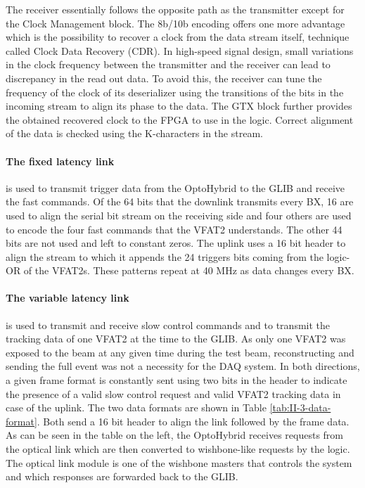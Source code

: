       The receiver essentially follows the opposite path as the transmitter except for the Clock Management block. The 8b/10b encoding offers one more advantage which is the possibility to recover a clock from the data stream itself, technique called Clock Data Recovery (CDR). In high-speed signal design, small variations in the clock frequency between the transmitter and the receiver can lead to discrepancy in the read out data. To avoid this, the receiver can tune the frequency of the clock of its deserializer using the transitions of the bits in the incoming stream to align its phase to the data. The GTX block further provides the obtained recovered clock to the FPGA to use in the logic. Correct alignment of the data is checked using the K-characters in the stream.

      \paragraph{The fixed latency link} is used to transmit trigger data from the OptoHybrid to the GLIB and receive the fast commands. Of the 64 bits that the downlink transmits every BX, 16 are used to align the serial bit stream on the receiving side and four others are used to encode the four fast commands that the VFAT2 understands. The other 44 bits are not used and left to constant zeros. The uplink uses a 16 bit header to align the stream to which it appends the 24 triggers bits coming from the logic-OR of the VFAT2s. These patterns repeat at 40 MHz as data changes every BX.

      \paragraph{The variable latency link} is used to transmit and receive slow control commands and to transmit the tracking data of one VFAT2 at the time to the GLIB. As only one VFAT2 was exposed to the beam at any given time during the test beam, reconstructing and sending the full event was not a necessity for the DAQ system. In both directions, a given frame format is constantly sent using two bits in the header to indicate the presence of a valid slow control request and valid VFAT2 tracking data in case of the uplink. The two data formats are shown in Table \ref{tab:II-3-data-format}. Both send a 16 bit header to align the link followed by the frame data. As can be seen in the table on the left, the OptoHybrid receives requests from the optical link which are then converted to wishbone-like requests by the logic. The optical link module is one of the wishbone masters that controls the system and which responses are forwarded back to the GLIB.

